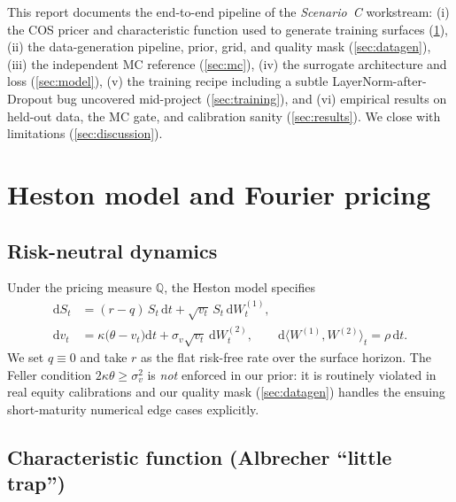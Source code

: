 \documentclass[11pt,a4paper]{article}
\begin{document}
This report documents the end-to-end pipeline of the
\emph{Scenario~C} workstream:
(i) the COS pricer and characteristic function used to generate
training surfaces (\cref{sec:theory}),
(ii) the data-generation pipeline, prior, grid, and quality mask
(\cref{sec:datagen}),
(iii) the independent MC reference (\cref{sec:mc}),
(iv) the surrogate architecture and loss (\cref{sec:model}),
(v) the training recipe including a subtle LayerNorm-after-Dropout bug
uncovered mid-project (\cref{sec:training}), and
(vi) empirical results on held-out data, the MC gate, and calibration
sanity (\cref{sec:results}). We close with limitations
(\cref{sec:discussion}).

\section{Heston model and Fourier pricing}
\label{sec:theory}

\subsection{Risk-neutral dynamics}

Under the pricing measure $\mathbb{Q}$, the Heston model specifies
\begin{subequations}\label{eq:heston}
\begin{align}
  \mathrm{d}S_t &= (r - q)\,S_t\,\mathrm{d}t + \sqrt{v_t}\,S_t\,\mathrm{d}W^{(1)}_t, \\
  \mathrm{d}v_t &= \kappa\bigl(\theta - v_t\bigr)\mathrm{d}t
                 + \sigma_v\sqrt{v_t}\,\mathrm{d}W^{(2)}_t, \qquad
  \mathrm{d}\langle W^{(1)},W^{(2)}\rangle_t = \rho\,\mathrm{d}t.
\end{align}
\end{subequations}
We set $q\equiv0$ and take $r$ as the flat risk-free rate over the
surface horizon. The Feller condition $2\kappa\theta \ge \sigma_v^2$
is \emph{not} enforced in our prior: it is routinely violated in real
equity calibrations and our quality mask (\cref{sec:datagen}) handles
the ensuing short-maturity numerical edge cases explicitly.

\subsection{Characteristic function (Albrecher ``little trap'')}
\label{sec:littletrap}
\end{document}
